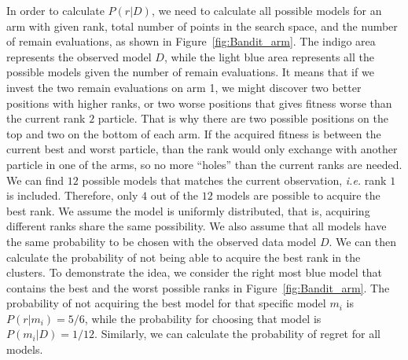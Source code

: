 In order to calculate $P(r|D)$, we need to calculate all possible models for an arm with given rank, 
total number of points in the search space, and the number of remain evaluations, 
as shown in Figure~\ref{fig:Bandit_arm}.
The indigo area represents the observed model $D$, 
while the light blue area represents all the possible models given the number of remain evaluations.
It means that if we invest the two remain evaluations on arm 1, 
we might discover two better positions with higher ranks,
or two worse positions that gives fitness worse than the current rank $2$ particle.
That is why there are two possible positions on the top and two on the bottom of each arm.
If the acquired fitness is between the current best and worst particle, 
than the rank would only exchange with another particle in one of the arms,
so no more ``holes'' than the current ranks are needed.
We can find $12$ possible models that matches the current observation, \textit{i.e.} rank $1$ is included.
Therefore, only $4$ out of the $12$ models are possible to acquire the best rank.
We assume the model is uniformly distributed, that is, acquiring different ranks share the same possibility.
We also assume that all models have the same probability to be chosen with the observed data model $D$.
We can then calculate the probability of not being able to acquire the best rank in the clusters.
To demonstrate the idea, we consider the right most blue model that contains the best and the worst possible ranks in Figure~\ref{fig:Bandit_arm}.
The probability of not acquiring the best model for that specific model $m_i$ is $P(r|m_i) = 5/6$,
while the probability for choosing that model is $P(m_i|D) = 1/12$.
Similarly, we can calculate the probability of regret for all models.



